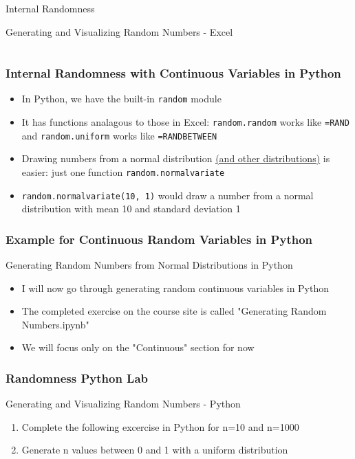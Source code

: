 \documentclass[handout, 11pt]{beamer}
\begin{document}
\begin{section}{Internal Randomness}
\begin{frame}
{\begin{block}{Generating and Visualizing Random Numbers - Excel}
\begin{tabular*}{\textwidth}{@{\extracolsep{\fill}}ccc}
\end{tabular*}
\end{block}
}
\label{labs:randomness-excel-lab-1}
\end{frame}
\begin{frame}
\frametitle{Internal Randomness with Continuous Variables in Python}
\begin{itemize}
\item In Python, we have the built-in
\texttt{random}
module
\vfill
\item It has functions analagous to those in Excel:
\texttt{random.random}
works like
\texttt{=RAND}
and
\texttt{random.uniform}
works like
\texttt{=RANDBETWEEN}
\vfill
\item Drawing numbers from a normal distribution
\textcolor{blue}{\underline{\href{https://docs.python.org/3.7/library/random.html\#real-valued-distributions}{(and other distributions)}}}
is easier: just one function
\texttt{random.normalvariate}
\vfill
\item \texttt{random.normalvariate(10, 1)}
would draw a number from a normal distribution with mean 10 and standard deviation 1
\end{itemize}
\end{frame}
\begin{frame}
\frametitle{Example for Continuous Random Variables in Python}
{
\begin{block}{Generating Random Numbers from Normal Distributions in Python}
\begin{itemize}
\item I will now go through generating random continuous variables in Python
\item The completed exercise on the course site is called "Generating Random Numbers.ipynb"
\item We will focus only on the "Continuous" section for now
\end{itemize}
\end{block}
}
\end{frame}
\begin{frame}
\frametitle{Randomness Python Lab}
{
\begin{block}{Generating and Visualizing Random Numbers - Python}
\begin{enumerate}
\item Complete the following excercise in Python for n=10 and n=1000
\item Generate n values between 0 and 1 with a uniform distribution

\end{enumerate}
\end{block}}
\end{frame}
\end{section}
\end{document}
